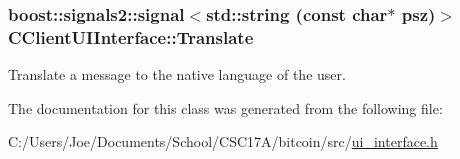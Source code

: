 \subsubsection[{Translate}]{\setlength{\rightskip}{0pt plus 5cm}boost\+::signals2\+::signal$<$std\+::string (const char$\ast$ psz)$>$ C\+Client\+U\+I\+Interface\+::\+Translate}\label{class_c_client_u_i_interface_a996160f65965769cf7fc50e6fd17dc9a}
Translate a message to the native language of the user. 

The documentation for this class was generated from the following file\+:\begin{DoxyCompactItemize}
\item 
C\+:/\+Users/\+Joe/\+Documents/\+School/\+C\+S\+C17\+A/bitcoin/src/\hyperlink{ui__interface_8h}{ui\+\_\+interface.\+h}\end{DoxyCompactItemize}

